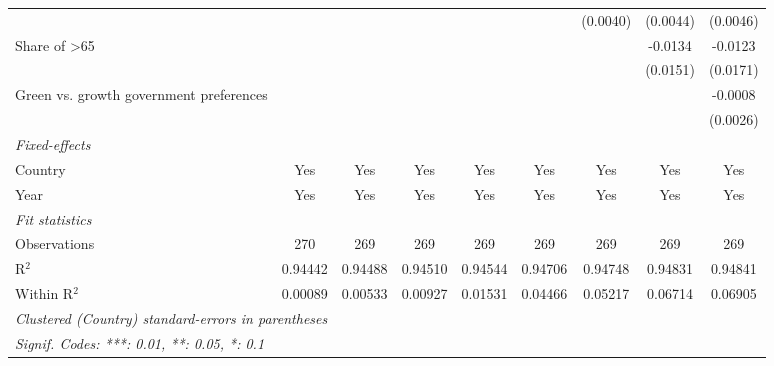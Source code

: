 \begin{table}[htbp]
\begin{tabular}{lcccccccc}
                                                               &          &          &          &          &          & (0.0040) & (0.0044) & (0.0046)\\   
      Share of >65                                             &          &          &          &          &          &          & -0.0134  & -0.0123\\   
                                                               &          &          &          &          &          &          & (0.0151) & (0.0171)\\   
      Green vs. growth government preferences                  &          &          &          &          &          &          &          & -0.0008\\   
                                                               &          &          &          &          &          &          &          & (0.0026)\\   
      \midrule
      \emph{Fixed-effects}\\
      Country                                                  & Yes      & Yes      & Yes      & Yes      & Yes      & Yes      & Yes      & Yes\\  
      Year                                                     & Yes      & Yes      & Yes      & Yes      & Yes      & Yes      & Yes      & Yes\\  
      \midrule
      \emph{Fit statistics}\\
      Observations                                             & 270      & 269      & 269      & 269      & 269      & 269      & 269      & 269\\  
      R$^2$                                                    & 0.94442  & 0.94488  & 0.94510  & 0.94544  & 0.94706  & 0.94748  & 0.94831  & 0.94841\\  
      Within R$^2$                                             & 0.00089  & 0.00533  & 0.00927  & 0.01531  & 0.04466  & 0.05217  & 0.06714  & 0.06905\\  
      \midrule \midrule
      \multicolumn{9}{l}{\emph{Clustered (Country) standard-errors in parentheses}}\\
      \multicolumn{9}{l}{\emph{Signif. Codes: ***: 0.01, **: 0.05, *: 0.1}}\\
   \end{tabular}
\end{table}


